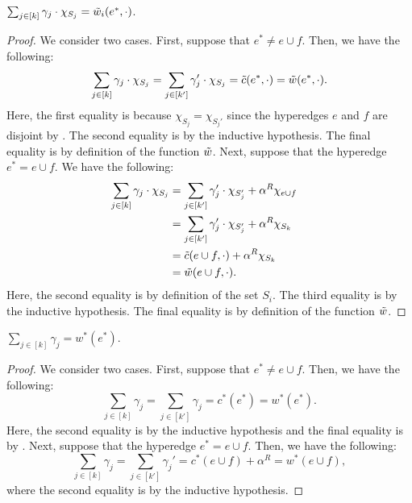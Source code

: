 \begin{claim}\label{claim:weak-to-strong:correctness:main:hyperedge-merge:property3}
     $\sum_{j \in [k]}\gamma_j\cdot \chi_{S_j} = \Tilde{w}_i(e^*, \cdot)$.
\end{claim}
\begin{proof}
    We consider two cases. First, suppose that $e^* \not = e\cup f$. Then, we have the following:
    $$\sum_{j \in [k]}\gamma_j\cdot \chi_{S_j} = \sum_{j \in [k']}\gamma_j'\cdot \chi_{S_j} = \Tilde{c}(e^*, \cdot) = \Tilde{w}(e^*, \cdot).$$
    Here, the first equality is because $\chi_{S_j} = \chi_{S_j'}$ since the hyperedges $e$ and $f$ are disjoint by . The second equality is by the inductive hypothesis. The final equality is by definition of the function $\Tilde{w}$. Next, suppose that the hyperedge $e^* = e\cup f$. We have the following:
    \begin{align*}
        \sum_{j \in [k]}\gamma_j\cdot \chi_{S_j}& = \sum_{j \in [k']}\gamma_j'\cdot \chi_{S_j'} + \alpha^R\chi_{e\cup f} &\\
        &= \sum_{j \in [k']}\gamma_j'\cdot \chi_{S_j'} + \alpha^R\chi_{S_k}&\\
        &= \Tilde{c}(e\cup f, \cdot) + \alpha^R\chi_{S_k}&\\
        &= \Tilde{w}(e\cup f, \cdot).&
    \end{align*}
    Here, the second equality is by definition of the set $S_i$. The third equality is by the inductive hypothesis. The final equality is by definition of the function $\Tilde{w}$.
\end{proof}

\begin{claim}\label{claim:weak-to-strong:correctness:main:hyperedge-merge:property4}
    $\sum_{j \in [k]}\gamma_j = w^*(e^*)$.
\end{claim}
\begin{proof}
    We consider two cases. First, suppose that $e^* \not = e\cup f$. Then, we have the following:
    $$\sum_{j \in [k]}\gamma_j = \sum_{j \in [k']}\gamma_j = c^*(e^*) = w^*(e^*).$$
    Here, the second equality is by the inductive hypothesis and the final equality is by . Next, suppose that the hyperedge $e^* = e \cup f$. Then, we have the following:
    $$\sum_{j \in [k]}\gamma_j = \sum_{j \in [k']}\gamma_j' = c^*(e\cup f) + \alpha^R= w^*(e\cup f),$$
    where the second equality is by the inductive hypothesis.
\end{proof}
\fi

